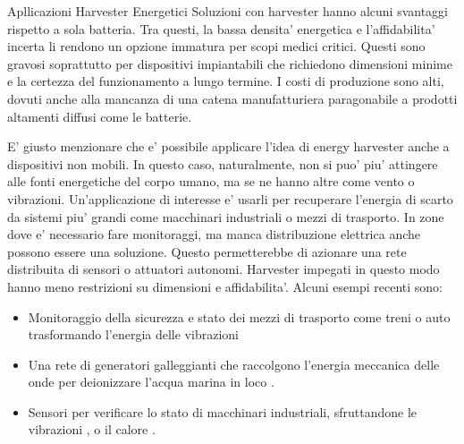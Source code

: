 \begin{section}{Apllicazioni Harvester Energetici}
    Soluzioni con harvester hanno alcuni svantaggi rispetto a sola batteria. Tra questi, la bassa densita' energetica e l'affidabilita' incerta li rendono un opzione immatura per scopi medici critici. Questi sono gravosi soprattutto per dispositivi impiantabili che richiedono dimensioni minime e la certezza del funzionamento a lungo termine. I costi di produzione sono alti, dovuti anche alla mancanza di una catena manufatturiera paragonabile a prodotti altamenti diffusi come le batterie.

    E' giusto menzionare che e' possibile applicare l'idea di energy harvester anche a dispositivi non mobili. In questo caso, naturalmente, non si puo' piu' attingere alle fonti energetiche del corpo umano, ma se ne hanno altre come vento o vibrazioni. Un'applicazione di interesse e' usarli per recuperare l'energia di scarto da sistemi piu' grandi come macchinari industriali o mezzi di trasporto. In zone dove e' necessario fare monitoraggi, ma manca distribuzione elettrica anche possono essere una soluzione. Questo permetterebbe di azionare una rete distribuita di sensori o attuatori autonomi. Harvester impegati in questo modo hanno meno restrizioni su dimensioni e affidabilita'. Alcuni esempi recenti sono: \begin{itemize}
        \item Monitoraggio della sicurezza e stato dei mezzi di trasporto come treni o auto trasformando l'energia delle vibrazioni \cite{liSmartRailwayTransportation, liuCompactHybridizedTriboelectricelectromagnetic2024}
        \item Una rete di generatori galleggianti che raccolgono l'energia meccanica delle onde per deionizzare l'acqua marina in loco \cite{renWavepoweredCapacitiveDeionization2024}. 
        \item Sensori per verificare lo stato di macchinari industriali, sfruttandone le vibrazioni \cite{alvarezruedaVibrationEnergyHarvesting2024, gaoHybridGeneratorEfficient2024}, o il calore \cite{deoliveiraDevelopmentHybridEnergy2024}.
    \end{itemize}
    
\end{section}
